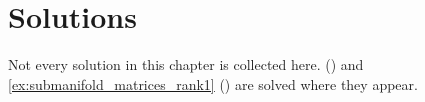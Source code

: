 
\section{Solutions}
\label{sec:submanifolds_solutions}

Not every solution in this chapter is collected here. 
() and \cref{ex:submanifold_matrices_rank1}
() are solved where they appear.



